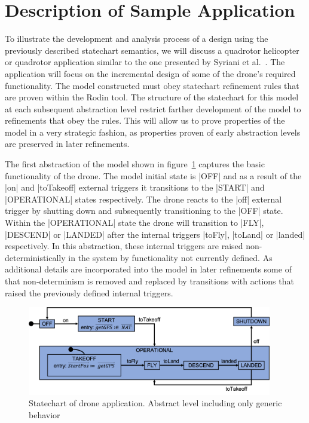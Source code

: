 

\section{Description of Sample Application}
To illustrate the development and analysis process of a design using the previously described 
statechart semantics, we will discuss a quadrotor helicopter or quadrotor application similar to 
the one presented by Syriani et al.~\cite{Syriani_2019}. The application will focus on the incremental 
design of some of the drone's required functionality.
The model constructed must obey statechart refinement rules that are proven within the Rodin tool.
The structure of the statechart for this model at each subsequent abstraction level restrict farther 
development of the model to refinements that obey the rules. This will allow us to prove properties 
of the model in a very strategic fashion, as properties proven of early abstraction levels 
are preserved in later refinements.

The first abstraction of the model shown in figure~\ref{fig:drone1} captures the basic 
functionality of the drone. The model initial state is |OFF| and as a result of the |on| and 
|toTakeoff| external triggers it transitions to the |START| and |OPERATIONAL| states respectively. 
The drone reacts to the |off| external trigger by shutting down and subsequently transitioning to the |OFF| state.
Within the |OPERATIONAL| state the drone will transition to |FLY|, |DESCEND| or |LANDED| 
after the internal triggers |toFly|, |toLand| or |landed| respectively. 
In this abstraction, these internal triggers are raised non-deterministically 
in the system by functionality not currently defined.
As additional details are incorporated into the model in later refinements some of that non-determinism is 
removed and replaced by transitions with actions that raised the previously defined internal triggers.

\begin{figure}[!h]
	\vspace{-.4cm}
	\centering
	\includegraphics[width=0.95\textwidth]{figures/Picture1.png}
	\caption{Statechart of drone application. Abstract level including only generic behavior }
	\label{fig:drone1}
	\vspace{-.4cm}
\end{figure} 

